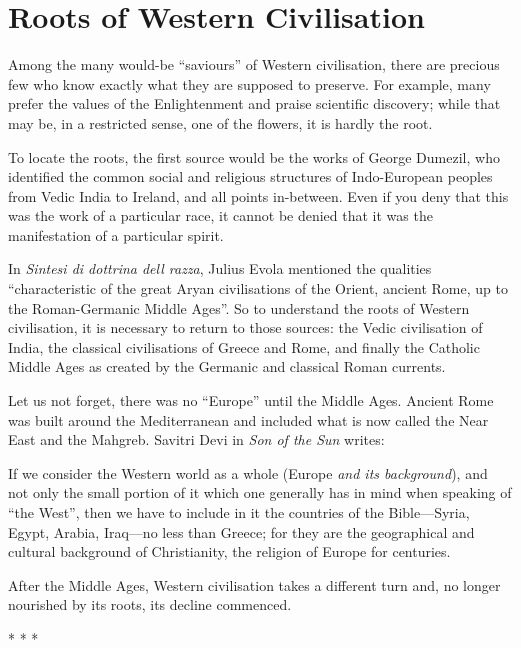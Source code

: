 \section{Roots of Western Civilisation}

Among the many would-be ``saviours'' of Western civilisation, there are precious few who know exactly what they are supposed to preserve. For example, many prefer the values of the Enlightenment and praise scientific discovery; while that may be, in a restricted sense, one of the flowers, it is hardly the root.

To locate the roots, the first source would be the works of George Dumezil, who identified the common social and religious structures of Indo-European peoples from Vedic India to Ireland, and all points in-between. Even if you deny that this was the work of a particular race, it cannot be denied that it was the manifestation of a particular spirit.

In \emph{Sintesi di dottrina dell razza}, Julius Evola mentioned the qualities ``characteristic of the great Aryan civilisations of the Orient, ancient Rome, up to the Roman-Germanic Middle Ages''. So to understand the roots of Western civilisation, it is necessary to return to those sources: the Vedic civilisation of India, the classical civilisations of Greece and Rome, and finally the Catholic Middle Ages as created by the Germanic and classical Roman currents.

Let us not forget, there was no ``Europe'' until the Middle Ages. Ancient Rome was built around the Mediterranean and included what is now called the Near East and the Mahgreb. Savitri Devi in \emph{Son of the Sun} writes:

\begin{quotex}
If we consider the Western world as a whole (Europe \emph{and its background}), and not only the small portion of it which one generally has in mind when speaking of ``the West'', then we have to include in it the countries of the Bible---Syria, Egypt, Arabia, Iraq---no less than Greece; for they are the geographical and cultural background of Christianity, the religion of Europe for centuries.
\end{quotex}


After the Middle Ages, Western civilisation takes a different turn and, no longer nourished by its roots, its decline commenced.



\begin{center}* * *\end{center}

